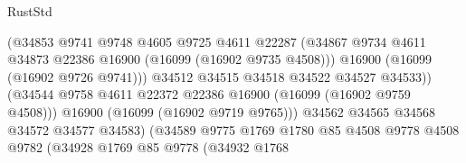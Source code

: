 \begin{lexlean}{RustStd}
\begin{coremodule}
                                            (@34853
                                              @9741
                                              @9748
                                              @4605
                                              @9725
                                              @4611
                                              @22287
                                              (@34867
                                                @9734
                                                @4611
                                                @34873
                                                @22386
                                                @16900
                                                (@16099 (@16902 @9735 @4508)))
                                              @16900
                                              (@16099 (@16902 @9726 @9741)))
                                            @34512
                                            @34515
                                            @34518
                                            @34522
                                            @34527
                                            @34533))
                                        (@34544
                                          @9758
                                          @4611
                                          @22372
                                          @22386
                                          @16900
                                          (@16099 (@16902 @9759 @4508)))
                                        @16900
                                        (@16099 (@16902 @9719 @9765)))
                                      @34562
                                      @34565
                                      @34568
                                      @34572
                                      @34577
                                      @34583)
                                    (@34589
                                      @9775
                                      @1769
                                      @1780
                                      @85
                                      @4508
                                      @9778
                                      @4508
                                      @9782
                                      (@34928
                                        @1769
                                        @85
                                        @9778
                                        (@34932
                                          @1768

\end{coremodule}
\end{lexlean}

